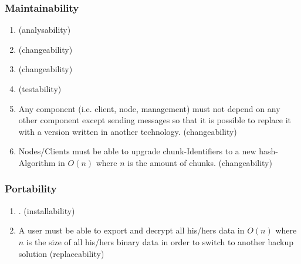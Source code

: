\subsubsection{Maintainability}
\begin{enumerate}
	\enumcountrestore
	\item {} (analysability)
	\item {} (changeability)
	\item {} (changeability)
	\item {} (testability)
	\item Any component (i.e. client, node, management) must not depend on any other component except sending messages so that it is possible to replace it with a version written in another technology. (changeability)
	\item Nodes/Clients must be able to upgrade chunk-Identifiers to a new hash-Algorithm in $O(n)$ where $n$ is the amount of chunks. (changeability)
	\enumcountsave
\end{enumerate}

\subsubsection{Portability}

\begin{enumerate}
	\enumcountrestore
	\item {}. (installability)
	\item A user must be able to export and decrypt all his/hers data in $O(n)$ where $n$ is the size of all his/hers binary data in order to switch to another backup solution (replaceability)
	\enumcountsave
\end{enumerate}
